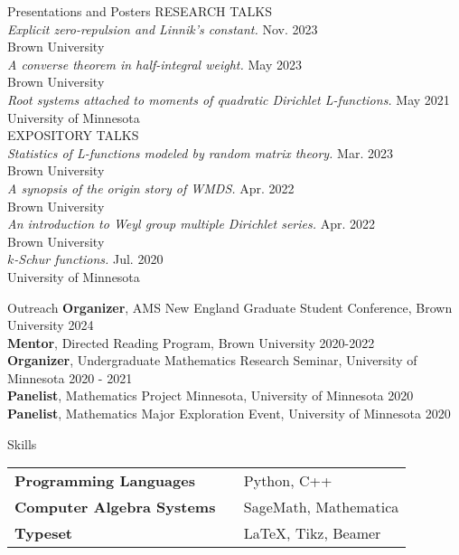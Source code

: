\documentclass{resume} %
\begin{document}
\begin{rSection}{Presentations and Posters}
RESEARCH TALKS \\
{\em Explicit zero-repulsion and Linnik's constant.} \hfill {Nov. 2023} \\
\hphantom{\quad}Brown University \\
{\em A converse theorem in half-integral weight.} \hfill {May 2023} \\
\hphantom{\quad}Brown University \\
{\em Root systems attached to moments of quadratic Dirichlet L-functions.} \hfill {May 2021} \\
\hphantom{\quad}University of Minnesota \\

EXPOSITORY TALKS \\
{\em Statistics of L-functions modeled by random matrix theory.} \hfill {Mar. 2023} \\ 
\hphantom{\quad}Brown University \\
{\em A synopsis of the origin story of WMDS.} \hfill {Apr. 2022} \\
\hphantom{\quad}Brown University \\
{\em An introduction to Weyl group multiple Dirichlet series.} \hfill {Apr. 2022} \\
\hphantom{\quad}Brown University \\
{\em $k$-Schur functions.} \hfill {Jul. 2020} \\ 
\hphantom{\quad}University of Minnesota \\
\end{rSection}

\begin{rSection}{Outreach}
{\bf Organizer}, AMS New England Graduate Student Conference, Brown University \hfill {2024} \\
{\bf Mentor}, Directed Reading Program, Brown University \hfill {2020-2022} \\
{\bf Organizer}, Undergraduate Mathematics Research Seminar, University of Minnesota \hfill {2020 - 2021} \\
{\bf Panelist}, Mathematics Project Minnesota, University of Minnesota \hfill {2020} \\
{\bf Panelist}, Mathematics Major Exploration Event, University of Minnesota \hfill {2020}
\end{rSection}

\begin{rSection}{Skills}
\begin{tabular}{ @{} >{\bfseries}l @{\hspace{6ex}} l }
    Programming Languages \ & Python, C++ \\
    Computer Algebra Systems \ & SageMath, Mathematica \\
    Typeset \ & LaTeX, Tikz, Beamer \\
\end{tabular}
\end{rSection}
\end{document}
